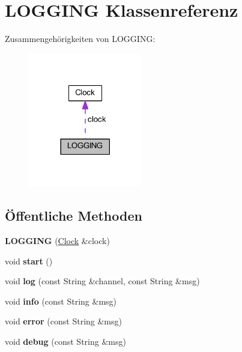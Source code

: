 \hypertarget{class_l_o_g_g_i_n_g}{}\section{L\+O\+G\+G\+I\+NG Klassenreferenz}
\label{class_l_o_g_g_i_n_g}


Zusammengehörigkeiten von L\+O\+G\+G\+I\+NG\+:\nopagebreak
\begin{figure}[H]
\begin{center}
\leavevmode
\includegraphics[width=141pt]{class_l_o_g_g_i_n_g__coll__graph}
\end{center}
\end{figure}
\subsection*{Öffentliche Methoden}
\begin{DoxyCompactItemize}
\item 
\mbox{\label{class_l_o_g_g_i_n_g_a564b401f4aa450d865223b9a5c4c8c60}} 
{\bfseries L\+O\+G\+G\+I\+NG} (\hyperlink{class_clock}{Clock} \&clock)
\item 
\mbox{\label{class_l_o_g_g_i_n_g_a79b6818ba95833469ed99f0d7ba7cf74}} 
void {\bfseries start} ()
\item 
\mbox{\label{class_l_o_g_g_i_n_g_a180904184ab56e7673643878223b87bb}} 
void {\bfseries log} (const String \&channel, const String \&msg)
\item 
\mbox{\label{class_l_o_g_g_i_n_g_a2dc3d19674867ddcf69ff3326ddd2059}} 
void {\bfseries info} (const String \&msg)
\item 
\mbox{\label{class_l_o_g_g_i_n_g_a20592566f7123f4027c814fd77edeb8d}} 
void {\bfseries error} (const String \&msg)
\item 
\mbox{\label{class_l_o_g_g_i_n_g_a42b38c28ff116505e20d154507abfb06}} 
void {\bfseries debug} (const String \&msg)
\end{DoxyCompactItemize}
